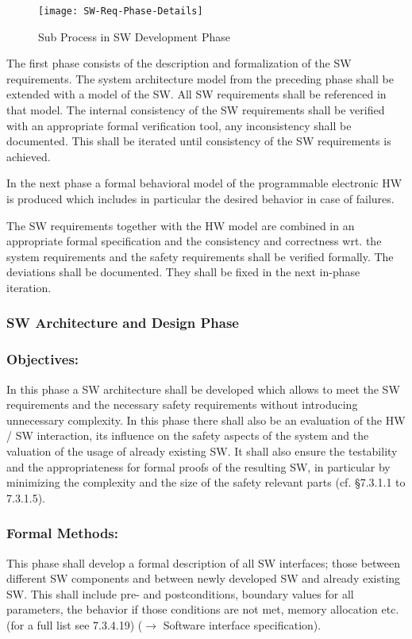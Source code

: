 \begin{figure}[ht]
  \centering
  \texttt{[image: SW-Req-Phase-Details]}
  \caption{Sub Process in SW Development Phase}
  \label{fig:detailed-sw-dev-phase}
\end{figure}

The first phase consists of the description and formalization of the SW
requirements. The system architecture model from the preceding phase shall be
extended with a model of the SW. All SW requirements shall be referenced in that
model. The internal consistency of the SW requirements shall be verified with an
appropriate formal verification tool, any inconsistency shall be
documented. This shall be iterated until consistency of the SW requirements is
achieved.

In the next phase a formal behavioral model of the programmable electronic HW is
produced which includes in particular the desired behavior in case of
failures.

The SW requirements together with the HW model are combined in an appropriate
formal specification  and the consistency and correctness wrt. the system
requirements and the safety requirements shall be verified formally. The
deviations shall be documented. They shall be fixed in the next in-phase
iteration.




\subsubsection{SW Architecture and Design Phase}
\label{sec:sw-arch-design}


\subsubsection{Objectives:}
\label{sec:sw-arch-objectives}
In this phase a SW architecture shall be developed which allows to meet the SW
requirements and the necessary safety requirements without introducing
unnecessary complexity. In this phase there shall also be an evaluation of the
HW / SW interaction, its influence on the safety aspects of the system and the
valuation of the usage of already existing SW. It shall also ensure the
testability and the appropriateness for formal proofs of the resulting SW, in
particular by minimizing the complexity and the size of the safety relevant
parts (cf. §7.3.1.1 to 7.3.1.5).

\subsubsection{Formal Methods:}
\label{sec:sw-arch-formal-methods}
This phase shall develop a formal description of all SW interfaces; those
between different SW components and between newly developed SW and already
existing SW. This shall include pre- and postconditions, boundary values for all
parameters, the behavior if those conditions are not met, memory allocation
etc. (for a full list see 7.3.4.19) ($\rightarrow$ Software interface
specification).

